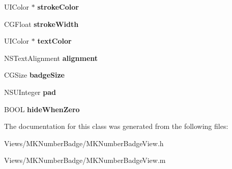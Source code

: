 \begin{DoxyCompactItemize}
\item 
\hypertarget{interface_m_k_number_badge_view_afcac41773fdb9fdb2b751843ba6cccf5}{U\+I\+Color $\ast$ {\bfseries stroke\+Color}}\label{interface_m_k_number_badge_view_afcac41773fdb9fdb2b751843ba6cccf5}

\item 
\hypertarget{interface_m_k_number_badge_view_afd17106ffa23870714690eaf7cbb71ce}{C\+G\+Float {\bfseries stroke\+Width}}\label{interface_m_k_number_badge_view_afd17106ffa23870714690eaf7cbb71ce}

\item 
\hypertarget{interface_m_k_number_badge_view_ac7651779abe69c876a279be0518aeda8}{U\+I\+Color $\ast$ {\bfseries text\+Color}}\label{interface_m_k_number_badge_view_ac7651779abe69c876a279be0518aeda8}

\item 
\hypertarget{interface_m_k_number_badge_view_aa574e1a1e92655575884f0a1eaf2325f}{N\+S\+Text\+Alignment {\bfseries alignment}}\label{interface_m_k_number_badge_view_aa574e1a1e92655575884f0a1eaf2325f}

\item 
\hypertarget{interface_m_k_number_badge_view_a7d3bb6a28c122cd2347575f3aaf4a3d6}{C\+G\+Size {\bfseries badge\+Size}}\label{interface_m_k_number_badge_view_a7d3bb6a28c122cd2347575f3aaf4a3d6}

\item 
\hypertarget{interface_m_k_number_badge_view_a0a47c8bff71bb346087cf80dbed51cbf}{N\+S\+U\+Integer {\bfseries pad}}\label{interface_m_k_number_badge_view_a0a47c8bff71bb346087cf80dbed51cbf}

\item 
\hypertarget{interface_m_k_number_badge_view_a3f3830b24f219975515c17b2b26bd43b}{B\+O\+O\+L {\bfseries hide\+When\+Zero}}\label{interface_m_k_number_badge_view_a3f3830b24f219975515c17b2b26bd43b}

\end{DoxyCompactItemize}


The documentation for this class was generated from the following files\+:\begin{DoxyCompactItemize}
\item 
Views/\+M\+K\+Number\+Badge/M\+K\+Number\+Badge\+View.\+h\item 
Views/\+M\+K\+Number\+Badge/M\+K\+Number\+Badge\+View.\+m\end{DoxyCompactItemize}
